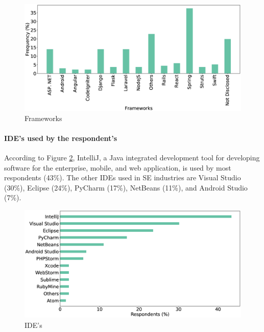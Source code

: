 \begin{figure}[h]
\centering
  \includegraphics[scale=0.18]{Figures/Respondents_frameworks}
  \caption{Frameworks}
  \label{fig:frameworks}
\end{figure}

\paragraph{IDE's used by the respondent's}
According to Figure \ref{fig:IDEs}, IntelliJ, a Java integrated development tool for developing software for the enterprise, mobile, and web application, is used by most respondents (43\%). The other IDEs used in SE industries are Visual Studio (30\%), Eclipse (24\%), PyCharm (17\%), NetBeans (11\%), and Android Studio (7\%).

\begin{figure}[htbp]
\centering
  \includegraphics[scale=0.18]{Figures/Respondents_IDEs}
  \caption{IDE's}
  \label{fig:IDEs}
\end{figure}
